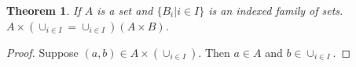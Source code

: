 

\newtheorem{theorem}{Theorem}

\begin{theorem}
  If $A$ is a set and $\{B_i | i \in I\}$ is an indexed family of sets. $A
  \times (\cup_{i\in I}=\cup_{i\in I})(A \times B)$.
\end{theorem}

\begin{proof}
  Suppose $(a,b) \in A \times (\cup_{i\in I})$. Then $a \in A$ and $b \in
  \cup_{i\in I}$.
\end{proof}
